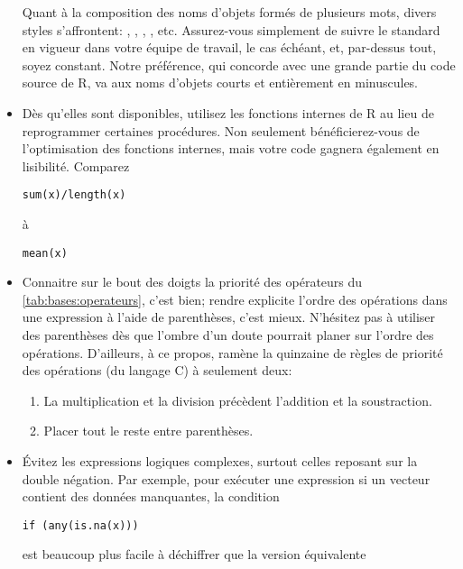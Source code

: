 \begin{itemize}
  Quant à la composition des noms d'objets formés de plusieurs mots,
  divers styles s'affrontent: ,
  , , ,
  etc. Assurez-vous simplement de suivre le standard en vigueur dans
  votre équipe de travail, le cas échéant, et, par-dessus tout, soyez
  constant. Notre préférence, qui concorde avec une grande partie du
  code source de R, va aux noms d'objets courts et entièrement en
  minuscules.
\item Dès qu'elles sont disponibles, utilisez les fonctions internes
  de R au lieu de reprogrammer certaines procédures. Non seulement
  bénéficierez-vous de l'optimisation des fonctions internes, mais
  votre code gagnera également en lisibilité. Comparez
  \begin{Schunk}
\begin{Verbatim}
sum(x)/length(x)
\end{Verbatim}
  \end{Schunk}
  à
  \begin{Schunk}
\begin{Verbatim}
mean(x)
\end{Verbatim}
  \end{Schunk}
\item Connaitre sur le bout des doigts la priorité des opérateurs du
  \autoref{tab:bases:operateurs}, c'est bien; rendre explicite l'ordre
  des opérations dans une expression à l'aide de parenthèses, c'est
  mieux. N'hésitez pas à utiliser des parenthèses dès que l'ombre d'un
  doute pourrait planer sur l'ordre des opérations. D'ailleurs, à ce
  propos, \citet{Oualline:C:1997} ramène la quinzaine de règles de
  priorité des opérations (du langage C) à seulement deux:
  \begin{enumerate}
  \item La multiplication et la division précèdent l'addition et la
    soustraction.
  \item Placer tout le reste entre parenthèses.
  \end{enumerate}
\item Évitez les expressions logiques complexes, surtout celles
  reposant sur la double négation. Par exemple, pour exécuter une
  expression si un vecteur contient des données manquantes, la
  condition
  \begin{Schunk}
\begin{Verbatim}
if (any(is.na(x)))
\end{Verbatim}
  \end{Schunk}
  est beaucoup plus facile à déchiffrer que la version équivalente

\end{itemize}
